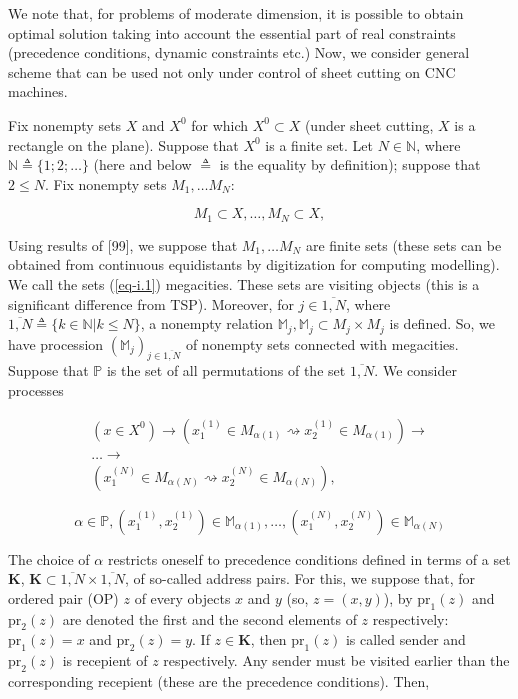 \documentclass{article}
\begin{document}
We note that,
for problems of moderate dimension,
it is possible to obtain optimal solution taking into account
the essential part of real constraints
(precedence conditions,
dynamic constraints etc.)
Now,
we consider general scheme that can be used not only
under control of sheet cutting on CNC machines.

Fix nonempty sets
$X$ and $X^0$
for which
$X^0 \subset X$
(under sheet cutting,
$X$ is a rectangle on the plane).
Suppose that
$X^0$ is a finite set.
Let
$N \in \mathbb N$,
where
$\mathbb N \triangleq \{1; 2; \dots \}$
(here and below
$\triangleq$
is the equality by definition);
suppose that
$2 \leqslant N$.
Fix nonempty sets
$M_1, \dots M_N$:

\begin{equation}
  \label{eq-i.1}
  M_1 \subset X,
  \dots ,
  M_N \subset X,
\end{equation}

Using results of
[99],  %
we suppose that
$M_1, \dots M_N$
are finite sets
(these sets can be obtained from
continuous equidistants by digitization
for computing modelling).
We call the sets
(\ref{eq-i.1})
megacities.
These sets are visiting objects
(this is a significant difference from TSP).
Moreover,
for
$j \in \overline{1, N}$,
where
$\overline{1,N} \triangleq \{k \in \mathbb N|k \leqslant N\}$,
a nonempty relation
$\mathbb M_j,
\mathbb M_j \subset M_j \times M_j$
is defined.
So, we have procession
$(\mathbb M_j)_{j \in \overline{1,N}}$
of nonempty sets connected with megacities.
Suppose that
$\mathbb P$
is the set of all permutations of the set
$\overline{1,N}$.
We consider processes

\begin{align*}
  (x\in X^0) \to
  (x_1^{(1)} \in M_{\alpha(1)} \rightsquigarrow x_2^{(1)} \in M_{\alpha(1)}) \to \\
  \dots \to \\
  (x_1^{(N)} \in M_{\alpha(N)} \rightsquigarrow x_2^{(N)} \in M_{\alpha(N)}),
\end{align*}

\begin{equation}
  \label{eq-i.2}
  \alpha \in \mathbb P,
  (x_1^{(1)}, x_2^{(1)}) \in \mathbb M_{\alpha(1)},
  \dots ,
  (x_1^{(N)}, x_2^{(N)}) \in \mathbb M_{\alpha(N)}
\end{equation}

The choice of
$\alpha$
restricts oneself to precedence conditions defined in terms of a set
$\mathbf K$,
$\mathbf K \subset \overline{1,N} \times \overline{1,N}$,
of so-called address pairs.
For this,
we suppose that,
for ordered pair (OP)
$z$
of every objects
$x$ and $y$
(so,
$z=(x,y)$),
by
$\mathrm{pr}_1(z)$
and
$\mathrm{pr}_2(z)$
are denoted the first and the second elements of
$z$
respectively:
$\mathrm{pr}_1(z)=x$
and
$\mathrm{pr}_2(z)=y$.
If
$z \in \mathbf K$,
then
$\mathrm{pr}_1(z)$
is called sender
and
$\mathrm{pr}_2(z)$
is recepient of
$z$
respectively.
Any sender must be visited earlier than
the corresponding recepient
(these are the precedence conditions).
Then,
\end{document}
